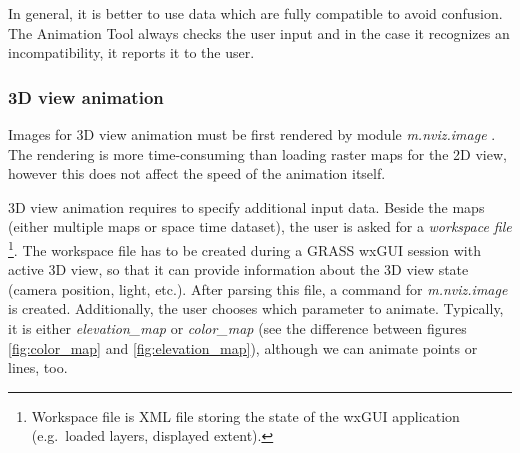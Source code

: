\documentclass[a4paper,12pt,oneside]{book}
\newcommand{\module}[1]{\textsl{#1}}
\newcommand{\at}{Animation Tool\xspace}
\begin{document}
In general, it is better to use data which are fully compatible to avoid confusion.
The \at always checks the user input and in the case it recognizes an incompatibility, it reports it to the user.


\subsubsection{3D view animation}
\label{sec:3dViewAnimation}
Images for 3D view animation must be first rendered by module \module{m.nviz.image} \cite{grassUserMan}.
The rendering is more time-consuming than loading raster maps for the 2D view,
however this does not affect the speed of the animation itself.

3D view animation requires to specify additional input data.
Beside the maps (either multiple maps or space time dataset), the user is asked for a \emph{workspace file}%
\footnote{Workspace file is XML file storing the state of the wxGUI application (e.g.\ loaded layers, displayed extent).}.
The workspace file has to be created during a GRASS wxGUI session with active 3D view,
so that it can provide information about the 3D view state (camera position, light, etc.).
After parsing this file, a command for \module{m.nviz.image}
is created.
Additionally, the user chooses which parameter to animate.
Typically, it is either \emph{elevation\_map} or \emph{color\_map}
(see the difference between figures \ref{fig:color_map} and \ref{fig:elevation_map}),
although we can animate points or lines, too.
\end{document}
